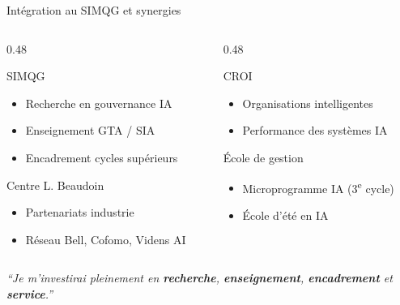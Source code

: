 \documentclass[aspectratio=169,11pt]{beamer}
\begin{document}
\begin{frame}{Intégration au SIMQG et synergies}
  \begin{columns}[T]
    \begin{column}{0.48\textwidth}
      \begin{block}{SIMQG}
        \begin{itemize}
          \item Recherche en gouvernance IA
          \item Enseignement GTA / SIA
          \item Encadrement cycles supérieurs
        \end{itemize}
      \end{block}
      \vspace{0.3em}
      \begin{block}{Centre L. Beaudoin}
        \begin{itemize}
          \item Partenariats industrie
          \item Réseau Bell, Cofomo, Videns AI
        \end{itemize}
      \end{block}
    \end{column}
    \begin{column}{0.48\textwidth}
      \begin{block}{CROI}
        \begin{itemize}
          \item Organisations intelligentes
          \item Performance des systèmes IA
        \end{itemize}
      \end{block}
      \vspace{0.3em}
      \begin{block}{École de gestion}
        \begin{itemize}
          \item Microprogramme IA (3\textsuperscript{e} cycle)
          \item École d'été en IA
        \end{itemize}
      \end{block}
    \end{column}
  \end{columns}
  
  \vspace{0.5em}
  \begin{alertblock}{}
    \centering
    \textit{``Je m'investirai pleinement en \textbf{recherche}, \textbf{enseignement}, \textbf{encadrement} et \textbf{service}.''}
  \end{alertblock}
\end{frame}
\end{document}
